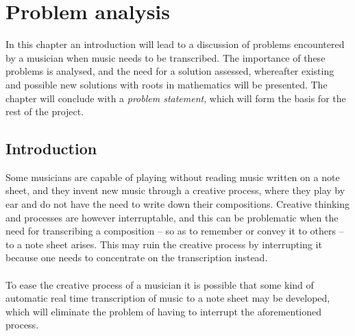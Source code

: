 \chapter{Problem analysis} \label{ch1}
In this chapter an introduction will lead to a discussion of problems encountered by a musician when music needs to be transcribed. The importance of these problems is analysed, and the need for a solution assessed, whereafter existing and possible new solutions with roots in mathematics will be presented. The chapter will conclude with a \textit{problem statement}, which will form the basis for the rest of the project.

\section{Introduction}
Some musicians are capable of playing without reading music written on a note sheet, and they invent new music through a creative process, where they play by ear and do not have the need to write down their compositions. Creative thinking and processes are however interruptable, and this can be problematic when the need for transcribing a composition -- so as to remember or convey it to others -- to a note sheet arises. This may ruin the creative process by interrupting it because one needs to concentrate on the transcription instead.
\\ \\
To ease the creative process of a musician it is possible that some kind of automatic real time transcription of music to a note sheet may be developed, which will eliminate the problem of having to interrupt the aforementioned process.

